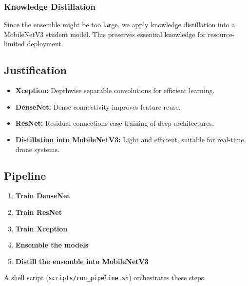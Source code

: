 \subsubsection{Knowledge Distillation}
Since the ensemble might be too large, we apply knowledge distillation into a MobileNetV3 student model.
This preserves essential knowledge for resource-limited deployment.

\subsection{Justification}
\label{subsec:justification}

\begin{itemize}
    \item \textbf{Xception:} Depthwise separable convolutions for efficient learning.
    \item \textbf{DenseNet:} Dense connectivity improves feature reuse.
    \item \textbf{ResNet:} Residual connections ease training of deep architectures.
    \item \textbf{Distillation into MobileNetV3:} Light and efficient, suitable for real-time drone systems.
\end{itemize}

\subsection{Pipeline}
\label{subsec:pipeline}

\begin{enumerate}
    \item \textbf{Train DenseNet}
    \item \textbf{Train ResNet}
    \item \textbf{Train Xception}
    \item \textbf{Ensemble the models}
    \item \textbf{Distill the ensemble into MobileNetV3}
\end{enumerate}
A shell script (\texttt{scripts/run\_pipeline.sh}) orchestrates these steps.




